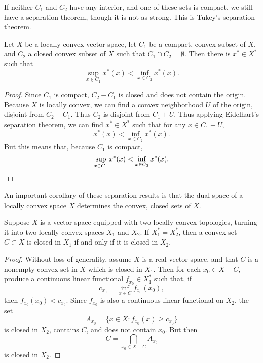 If neither $C_1$ and $C_2$ have any interior, and one of these sets is compact, we still have a separation theorem, though it is not as strong. This is Tukey's separation theorem.

\begin{theorem}
    Let $X$ be a locally convex vector space, let $C_1$ be a compact, convex subset of $X$, and $C_2$ a closed convex subset of $X$ such that $C_1 \cap C_2 = \emptyset$. Then there is $x^* \in X^*$ such that
    \[ \sup_{x \in C_1} x^*(x) < \inf_{x \in C_2} x^*(x). \]
\end{theorem}
\begin{proof}
    Since $C_1$ is compact, $C_2 - C_1$ is closed and does not contain the origin. Because $X$ is locally convex, we can find a convex neighborhood $U$ of the origin, disjoint from $C_2 - C_1$. Thus $C_2$ is disjoint from $C_1 + U$. Thus applying Eidelhart's separation theorem, we can find $x^* \in X^*$ such that for any $x \in C_1 + U$,
    \[ x^*(x) < \inf_{x \in C_2} x^*(x). \]
    But this means that, because $C_1$ is compact,
    \[ \sup_{x \in C_1} x^*(x) < \inf_{x \in C_2} x^*(x). \qedhere \]
\end{proof}

An important corollary of these separation results is that the dual space of a locally convex space $X$ determines the convex, closed sets of $X$.

\begin{theorem}
    Suppose $X$ is a vector space equipped with two locally convex topologies, turning it into two locally convex spaces $X_1$ and $X_2$. If $X_1^* = X_2^*$, then a convex set $C \subset X$ is closed in $X_1$ if and only if it is closed in $X_2$.
\end{theorem}
\begin{proof}
    Without loss of generality, assume $X$ is a real vector space, and that $C$ is a nonempty convex set in $X$ which is closed in $X_1$. Then for each $x_0 \in X - C$, produce a continuous linear functional $f_{x_0} \in X_1^*$ such that, if
    \[ c_{x_0} = \inf_{x \in C} f_{x_0}(x_0), \]
    then $f_{x_0}(x_0) < c_{x_0}$. Since $f_{x_0}$ is also a continuous linear functional on $X_2$, the set
    \[ A_{x_0} = \{ x \in X: f_{x_0}(x) \geq c_{x_0} \} \]
    is closed in $X_2$, contains $C$, and does not contain $x_0$. But then
    \[ C = \bigcap_{x_0 \in X - C} A_{x_0} \]
    is closed in $X_2$.
\end{proof}





